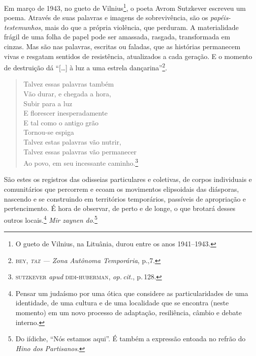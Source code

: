 \noindent{}Em março de 1943, no gueto de Vilnius\footnote{O gueto de Vilnius,
  na Lituânia, durou entre os anos 1941--1943.}, o poeta Avrom Sutzkever escreveu um poema. Através de suas palavras e imagens de sobrevivência, são os \emph{papéis-testemunhos}, mais do que a própria violência, que perduram. A materialidade frágil de uma folha de papel pode ser amassada, rasgada, transformada em cinzas. Mas são nas palavras, escritas ou faladas, que as histórias permanecem vivas e resgatam sentidos de resistência, atualizados a cada geração. E o momento de destruição dá ``{[}\ldots{}{]} à luz a uma estrela dançarina''\footnote{\textsc{bey}, \emph{\textsc{taz} --- Zona Autônoma Temporária}, p.,7.}. 


\begin{verse}
Talvez essas palavras também\\
Vão durar, e chegada a hora,\\
Subir para a luz\\
E florescer inesperadamente\\
E tal como o antigo grão\\
Tornou-se espiga\\
Talvez estas palavras vão nutrir,\\
Talvez essas palavras vão permanecer\\
Ao povo, em seu incessante caminho.\footnote{\textsc{sutzkever} \emph{apud}
  \textsc{didi-huberman}, \emph{op.\,cit.}, p.\,128.}
\end{verse} 


São estes os registros das odisseias particulares e coletivas, de corpos individuais e comunitários que percorrem e ecoam os movimentos elipsoidais das diásporas, nascendo e se construindo em territórios temporários, passíveis de apropriação e pertencimento. É hora de observar, de perto e de longe, o que brotará desses outros locais.\footnote{Pensar um judaísmo por uma ótica que considere as particularidades de uma identidade, de uma cultura e de uma localidade que se encontra (neste momento) em um novo processo de adaptação, resiliência, câmbio e debate interno.} \emph{Mir zaynen do}.\footnote{Do iídiche, ``Nós estamos aqui''. É também a expressão entoada no refrão do \emph{Hino dos Partisanos}.}

